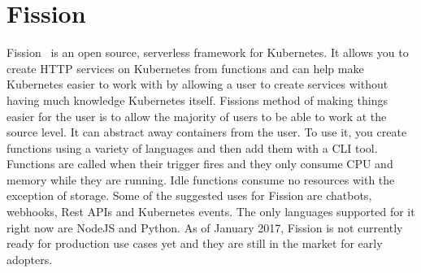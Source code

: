 \section{Fission}
Fission~\cite{hid-sp18-521-FissionBlog} is an open source, serverless
framework for Kubernetes. It allows you to create HTTP services
on Kubernetes from functions and can help make Kubernetes easier
to work with by allowing a user to create services without having
much knowledge Kubernetes itself. Fissions method of making things easier
for the user is to allow the majority of users to be able to work at the
source level. It can abstract away containers from the user. To use 
it, you create functions using a variety of languages and then add them
with a CLI tool. Functions are called when their trigger fires and they
only consume CPU and memory while they are running. Idle functions
consume no resources with the exception of storage. Some of the 
suggested uses for Fission are chatbots, webhooks, Rest APIs and 
Kubernetes events. The only languages supported for it right now
are NodeJS and Python. As of January 2017, Fission is not currently
ready for production use cases yet and they are still in the market
for early adopters.
